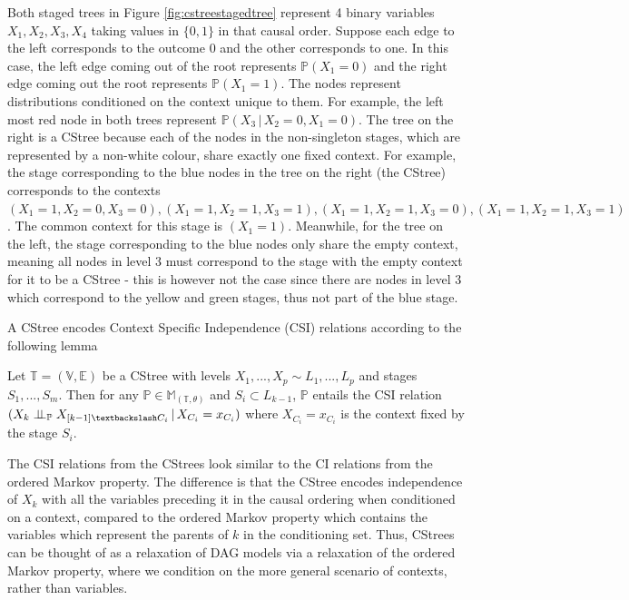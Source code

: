\documentclass{tufte-book}
\begin{document}
\begin{Definition}
Both staged trees in Figure \ref{fig:cstreestagedtree} represent 4 binary variables \(X_1,X_2,X_3,X_4\) taking values in \(\{0,1\}\) in that causal order. Suppose each edge to the left corresponds to the outcome \(0\) and the other corresponds to one. In this case, the left edge coming out of the root represents \(\mathbb{P}(X_1 = 0)\) and the right edge coming out the root represents \(\mathbb{P}(X_1 = 1)\). The nodes represent distributions conditioned on the context unique to them. For example, the left most red node in both trees represent \(\mathbb{P}(X_3 \,|\, X_2=0, X_1=0)\). The tree on the right is a CStree because each of the nodes in the non-singleton stages, which are represented by a non-white colour, share exactly one fixed context. For example, the stage corresponding to the blue nodes in the tree on the right (the CStree) corresponds to the contexts \((X_1=1, X_2=0, X_3=0), (X_1=1, X_2=1, X_3=1), (X_1=1, X_2=1, X_3=0), (X_1=1, X_2=1, X_3=1)\). The common context for this stage is  \((X_1=1)\). Meanwhile, for the tree on the left, the stage corresponding to the blue nodes only share the empty context, meaning all nodes in level 3 must correspond to the stage with the empty context for it to be a CStree - this is however not the case since there are nodes in level 3 which correspond to the yellow and green stages, thus not part of the blue stage. 


A CStree encodes Context Specific Independence (CSI) relations according to the following lemma \cite{duarte-2021-repres-learn}


\begin{lemma}\label{lem:cstreecsi}

Let $\mathbb{T} = (\mathbb{V},\mathbb{E})$ be a CStree with levels $X_1,...,X_p \sim L_1,...,L_p$ and stages $S_1,...,S_m$. Then for any $\mathbb{P} \in \mathbb{M}_{(\mathbb{T},\theta)}$ and $S_i \subset L_{k-1}$, $\mathbb{P}$ entails the CSI relation $(X_k \indep_{\mathbb{P}} X_{[k-1] \textbackslash C_i} \, | \, X_{C_i} = x_{C_i})$ where $X_{C_i}=x_{C_i}$ is the context fixed by the stage $S_i$.

\end{lemma}

The CSI relations from the CStrees look similar to the CI relations from the ordered Markov property. The difference is that the CStree encodes independence of \(X_k\) with all the variables preceding it in the causal ordering when conditioned on a context, compared to the ordered Markov property which contains the variables which represent the parents of \(k\) in the conditioning set. Thus, CStrees can be thought of as a relaxation of DAG models via a relaxation of the ordered Markov property, where we condition on the more general scenario of contexts, rather than variables. 




\end{Definition}
\end{document}
